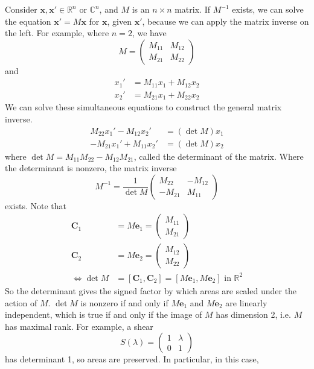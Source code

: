\documentclass{article}
\begin{document}
	Consider $\bm x, \bm x' \in \mathbb R^n$ or $\mathbb C^n$, and $M$ is an $n \times n$ matrix. If $M^{-1}$ exists, we can solve the equation $\bm x' = M \bm x$ for $\bm x$, given $\bm x'$, because we can apply the matrix inverse on the left. For example, where $n=2$, we have
	\[ M = \begin{pmatrix}
		M_{11} & M_{12} \\
		M_{21} & M_{22}
	\end{pmatrix} \]
	and
	\begin{align*}
		x_1' &= M_{11}x_1 + M_{12}x_2 \\
		x_2' &= M_{21}x_1 + M_{22}x_2
	\end{align*}
	We can solve these simultaneous equations to construct the general matrix inverse.
	\begin{align*}
		M_{22} x_1' - M_{12}x_2' &= (\det M)x_1 \\
		-M_{21} x_1' + M_{11}x_2' &= (\det M)x_2
	\end{align*}
	where $\det M = M_{11} M_{22} - M_{12} M_{21}$, called the determinant of the matrix. Where the determinant is nonzero, the matrix inverse
	\[ M^{-1} = \frac{1}{\det M}\begin{pmatrix}
		M_{22} & -M_{12} \\
		-M_{21} & M_{11}
	\end{pmatrix} \]
	exists. Note that
	\begin{align*}
		\bm C_1 &= M \bm e_1 = \begin{pmatrix} M_{11} \\ M_{21} \end{pmatrix} \\
		\bm C_2 &= M \bm e_2 = \begin{pmatrix} M_{12} \\ M_{22} \end{pmatrix} \\
		\iff \det M &= [\bm C_1, \bm C_2] = [M\bm e_1, M\bm e_2] \text{ in } \mathbb R^2
	\end{align*}
	So the determinant gives the signed factor by which areas are scaled under the action of $M$. $\det M$ is nonzero if and only if $M\bm e_1$ and $M\bm e_2$ are linearly independent, which is true if and only if the image of $M$ has dimension 2, i.e. $M$ has maximal rank. For example, a shear
	\[ S(\lambda) = \begin{pmatrix}
		1 & \lambda \\ 0 & 1
	\end{pmatrix} \]
	has determinant 1, so areas are preserved. In particular, in this case,
\end{document}
